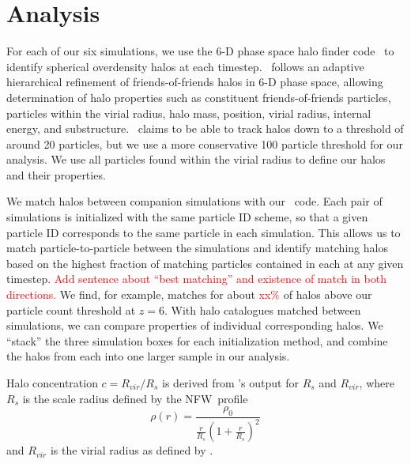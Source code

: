 \section{Analysis}
\label{sec:analysis}

For each of our six simulations, we use the 6-D phase space halo finder code \rockstar\ to identify spherical overdensity halos at each timestep.  \rockstar\ follows an adaptive hierarchical refinement of friends-of-friends halos in 6-D phase space\cn, allowing determination of halo properties such as constituent friends-of-friends particles, particles within the virial radius, halo mass, position, virial radius, internal energy, and substructure.  \rockstar\ claims to be able to track halos down to a threshold of around 20 particles\cn, but we use a more conservative 100 particle threshold for our analysis.  We use all particles found within the virial radius to define our halos and their properties.

We match halos between companion simulations with our \crossmatch\ code\cn.  Each pair of simulations is initialized with the same particle ID scheme, so that a given particle ID corresponds to the same particle in each simulation.  This allows us to match particle-to-particle between the simulations and identify matching halos based on the highest fraction of matching particles contained in each at any given timestep.  \textcolor{red}{Add sentence about ``best matching'' and existence of match in both directions.}  We find, for example, matches for about \textcolor{red}{xx\%} of halos above our particle count threshold at $z = 6$.  With halo catalogues matched between simulations, we can compare properties of individual corresponding halos.  We ``stack'' the three simulation boxes for each initialization method, and combine the halos from each into one larger sample in our analysis.


Halo concentration $c=R_{vir}/R_{s}$ is derived from \rockstar's output for $R_{s}$ and $R_{vir}$, where $R_{s}$ is the scale radius defined by the NFW\cn\ profile
\begin{equation} \label{eq:nfw_profile}
	\rho(r) = \frac{ \rho_{0} }{ \frac{ r }{ R_{s}} \left( 1 + \frac{r}{R_{s}} \right)^{2} }
\end{equation}
and $R_{vir}$ is the virial radius as defined by \citet{1998ApJ...495...80B}.

